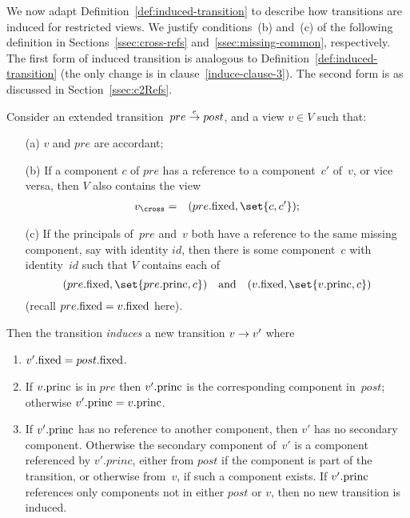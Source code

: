 We now adapt Definition~\ref{def:induced-transition} to describe how
transitions are induced for restricted views.  We justify conditions~(b)
and~(c) of the following definition in Sections~\ref{ssec:cross-refs}
and~\ref{ssec:missing-common}, respectively.  The first form of induced
transition is analogous to Definition~\ref{def:induced-transition} (the only
change is in clause~\ref{induce-clause-3}).  The second form is as discussed
in Section~\ref{ssec:c2Refs}.
%
\begin{definition}
\label{def:induced-transition-singleRef}
Consider an extended transition~$pre \stackrel{e}\rightarrow post$, and a view $v \in V$
such that:
%
\begin{enumerate}
\item[(a)] $v$ and $pre$ are accordant;

\item[(b)] If a component $c$ of $pre$ has a reference
  to a component~$c'$ of~$v$, or vice versa, then $V$ also contains the view
\begin{eqnarray*}
v_\cross & = & (pre.\fixed, \set{c, c'});
\end{eqnarray*}

\item[(c)] If the principals of~$pre$ and~$v$ both have a reference to the
  same missing component, say with identity $id$, then there is some
  component~$c$ with identity~$id$ such that $V$ contains each of
\[
(pre.\fixed, \set{pre.\princ, c}) \quad\mbox{and}\quad 
(v.\fixed, \set{v.\princ, c})
\]
(recall $pre.\mathrm{fixed} = v.\mathrm{fixed}$ here).
\end{enumerate}
%
Then the transition \emph{induces} a new
transition $v \stackrel{}\rightarrow v'$ where
\begin{enumerate}
\item $v'.\mathrm{fixed} = post.\mathrm{fixed}$.

\item If $v.\mathrm{princ}$ is in $pre$ then $v'.\mathrm{princ}$ is the corresponding
  component in~$post$; otherwise $v'.\mathrm{princ} = v.\mathrm{princ}$.

\item\label{induce-clause-3} If $v'.\mathrm{princ}$ has no reference to another
  component, then $v'$ has no secondary component.  Otherwise the secondary
  component of~$v'$ is a component referenced by $v'.princ$, either from
  $post$ if the component is part of the transition, or otherwise from~$v$, if
  such a component exists.  If $v'.\mathrm{princ}$ references only components not in
  either $post$ or $v$, then no new transition is induced.


\end{enumerate}
\end{definition}

